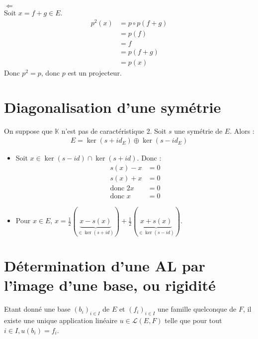 \documentclass[../main.tex]{subfiles}
\begin{document}
$\boxed{\Leftarrow}$ \\
Soit $x = f + g \in E$. 
\begin{align*}
    p^2(x) &= p \circ p(f + g) \\
    &= p(f) \\
    &= f \\
    &= p(f + g) \\
    &= p(x)
\end{align*}
Donc $p^2 = p$, donc $p$ est un projecteur.

\section{Diagonalisation d'une symétrie}
\begin{tcolorbox}[title=Théorème 21.59, title filled=false, colframe=orange, colback=orange!10!white]
    On suppose que $\mathbb{K}$ n'est pas de caractéristique 2. Soit $s$ une symétrie de $E$. Alors :
    \begin{align*}
        E = \ker(s + id_E) \oplus \ker(s - id_E)
    \end{align*}
\end{tcolorbox}

\begin{itemize}
    \item Soit $x\in \ker(s - id) \cap \ker(s + id)$. Donc : 
    \begin{align*}
        s(x) - x &= 0 \\
        s(x) + x &= 0 \\
        \text{donc } 2x &= 0 \\
        \text{donc } x &= 0
    \end{align*}

    \item Pour $x \in E$, $x = \frac{1}{2}(\underbrace{x - s(x)}_{\in \ker(s + id)}) + \frac{1}{2}(\underbrace{x + s(x)}_{\in \ker(s - id)})$. \\
\end{itemize}

\section{Détermination d'une AL par l'image d'une base, ou rigidité}
\begin{tcolorbox}[title=Propostion 21.63, title filled=false, colframe=lightblue, colback=lightblue!10!white]
    Etant donné une base $(b_i)_{i\in I}$ de $E$ et $(f_i)_{i\in I}$ une famille quelconque de $F$, il existe une unique application linéaire $u\in \mathcal{L}(E, F)$ telle que pour tout $i \in I, u(b_i) = f_i$.
\end{tcolorbox}
\end{document}
